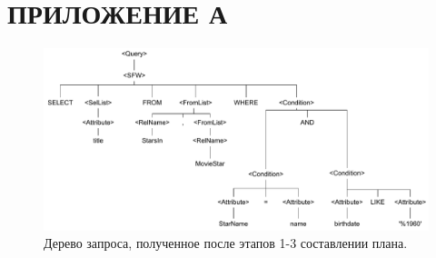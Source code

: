 \section*{ПРИЛОЖЕНИЕ А}
\vspace{-1cm}
\begin{figure}[H]
	\includegraphics[width=\linewidth]{images/query_tree.pdf}
	\caption{Дерево запроса, полученное после этапов 1-3 составлении плана.}
	\label{image:db_diagram_chinook}
\end{figure}

\pagebreak